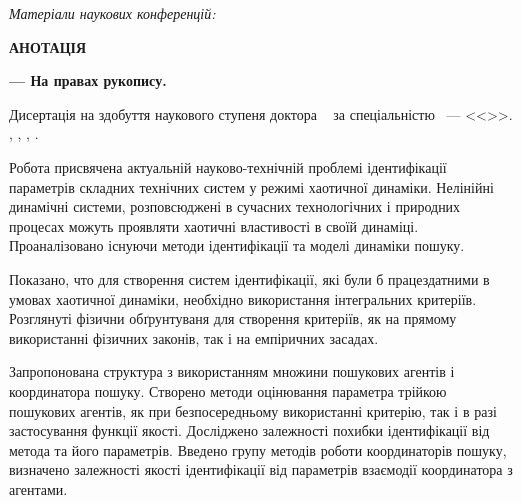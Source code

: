 \documentclass[a4paper,13pt]{atuaref}
\newcommand{\xsect}[1]{\vspace{0.15ex}\begin{center}\textbf{#1}\end{center}\vspace{4pt}\penalty10000}
\newcommand{\xxxsect}[1]{\vspace{0.02ex}\textit{#1}\vspace{0.02ex}\penalty10000}
\begin{document}
\printbibliography[heading=none, keyword=foreign]

\xxxsect{Матеріали наукових конференцій:}

\printbibliography[heading=none, keyword=confer]



\xsect{АНОТАЦІЯ}

\textbf{\dissauthorUa}
\textbf{\booknameUa}
\textbf{--- На правах рукопису.}

Дисертація на здобуття наукового ступеня
доктора
\dissScopeUa\ {}
за спеціальністю
\dissSpecId\ --- <<\dissSpecUa>>.
\institutionUa, \belongUa, \cityUa, \bookyear.


Робота присвячена актуальній науково-технічній проблемі
ідентифікації параметрів складних технічних систем у режимі хаотичної динаміки.
Нелінійні динамічні системи, розповсюджені в сучасних технологічних і
природних процесах можуть проявляти хаотичні властивості в своїй динаміці.
Проаналізовано існуючи методи ідентифікації та моделі динаміки пошуку.

Показано, что для створення систем ідентифікації, які були б працездатними
в умовах хаотичної динаміки, необхідно використання інтегральних критеріїв.
Розглянуті фізични обґрунтуваня для створення критеріїв,
як на прямому використанні фізичних законів, так і на емпіричних засадах.

Запропонована
структура з використанням множини пошукових агентів і координатора пошуку.
Створено методи оцінювання параметра трійкою пошукових агентів, як
при безпосередньому використанні критерію, так і в разі застосування функції якості.
Досліджено залежності похибки ідентифікації від метода та його параметрів.
Введено групу методів роботи координаторів пошуку,
визначено залежності якості ідентифікації від параметрів взаємодії
координатора з агентами.
\end{document}
